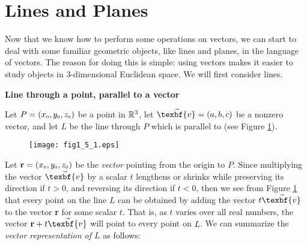 \section{Lines and Planes}
Now that we know how to perform some operations on vectors, we can start to deal with some familiar geometric objects,
like lines and planes, in the language of vectors. The reason for doing this is simple: using vectors makes it easier
to study objects in 3-dimensional Euclidean space. We will first consider lines.\vspace{4mm}

\par\noindent\textbf{\large{Line through a point, parallel to a vector}}\normalsize\vspace{2mm}

Let $P = (x_{\scriptscriptstyle 0},y_{\scriptscriptstyle 0},z_{\scriptscriptstyle 0})$ be a point in $\mathbb{R}^{3}$, let $\vec{\texbf{v}} = (a,b,c)$ be a nonzero
vector, and let $L$ be the line through $P$ which is parallel to  (see Figure \ref{fig:linepvec}).

\begin{figure}[h]
 \begin{center}
  \texttt{[image: fig1\_5\_1.eps]}
 \end{center}\vspace{-5mm}
 \caption[]{}
 \label{fig:linepvec}
\end{figure}

Let $\textbf{r} = (x_{\scriptscriptstyle 0},y_{\scriptscriptstyle 0},z_{\scriptscriptstyle 0})$ be the \emph{vector} pointing from the origin to $P$. Since
multiplying the vector $\vec{\texbf{v}}$ by a scalar $t$ lengthens or shrinks  while preserving its direction
if $t > 0$, and reversing its direction if $t < 0$, then we see from Figure \ref{fig:linepvec} that every point on the
line $L$ can be obtained by adding the vector $t \vec{\texbf{v}}$ to the vector \textbf{r} for some scalar $t$. That is, as
$t$ varies over all real numbers, the vector $\textbf{r} + t \vec{\texbf{v}}$ will point to every point on $L$. We can
summarize the \emph{vector representation of $L$} as follows:\vspace{1mm}

